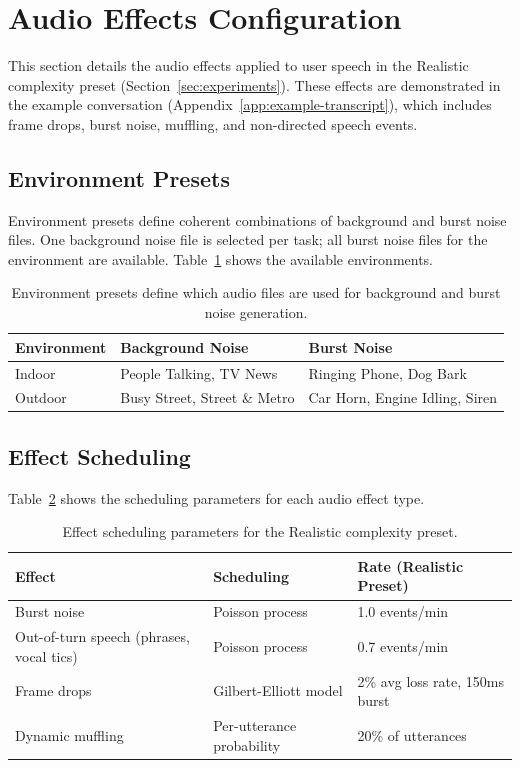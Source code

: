 \section{Audio Effects Configuration}
\label{app:audio-effects}

This section details the audio effects applied to user speech in the Realistic complexity preset (Section~\ref{sec:experiments}). These effects are demonstrated in the example conversation (Appendix~\ref{app:example-transcript}), which includes frame drops, burst noise, muffling, and non-directed speech events.

\subsection{Environment Presets}

Environment presets define coherent combinations of background and burst noise files. One background noise file is selected per task; all burst noise files for the environment are available. Table~\ref{tab:environment-presets} shows the available environments.

\begin{table}[h]
\centering
\begin{tabular}{lll}
\toprule
\textbf{Environment} & \textbf{Background Noise} & \textbf{Burst Noise} \\
\midrule
Indoor & People Talking, TV News & Ringing Phone, Dog Bark \\
Outdoor & Busy Street, Street \& Metro & Car Horn, Engine Idling, Siren \\
\bottomrule
\end{tabular}
\caption{Environment presets define which audio files are used for background and burst noise generation.}
\label{tab:environment-presets}
\end{table}

\subsection{Effect Scheduling}

Table~\ref{tab:effect-scheduling} shows the scheduling parameters for each audio effect type.

\begin{table}[h]
\centering
\begin{tabular}{lll}
\toprule
\textbf{Effect} & \textbf{Scheduling} & \textbf{Rate (Realistic Preset)} \\
\midrule
Burst noise & Poisson process & 1.0 events/min \\
Out-of-turn speech (phrases, vocal tics) & Poisson process & 0.7 events/min \\
Frame drops & Gilbert-Elliott model & 2\% avg loss rate, 150ms burst \\
Dynamic muffling & Per-utterance probability & 20\% of utterances \\
\bottomrule
\end{tabular}
\caption{Effect scheduling parameters for the Realistic complexity preset.}
\label{tab:effect-scheduling}
\end{table}


